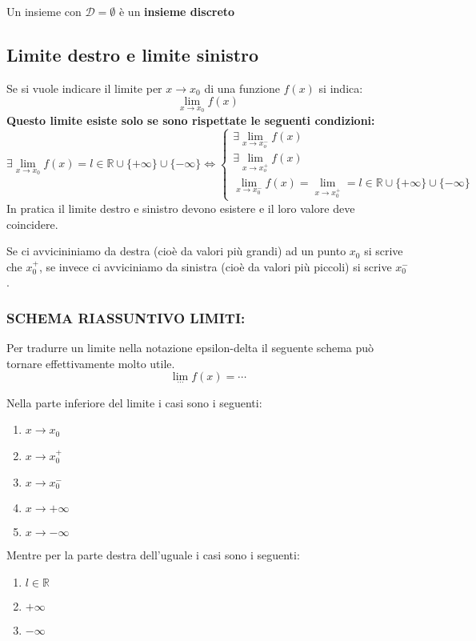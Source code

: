 Un insieme con $\mathcal{D} = \emptyset $ è un \textbf{insieme discreto}

\subsection{Limite destro e limite sinistro}
Se si vuole indicare il limite per $x \to x_0$ di una funzione $f(x)$ si indica:
\begin{equation*}
	\lim_{x \to x_0} f(x)
\end{equation*}
\textbf{Questo limite esiste solo se sono rispettate le seguenti condizioni:}
\begin{equation*}
	\exists \lim_{x \to x_0} f(x) = l \in \mathbb{R} \cup \{+\infty\} \cup \{-\infty\}\iff 
	\begin{cases*}
		\exists \lim_{x \to x_o^-} f(x)\\
		\exists \lim_{x \to x_o^+} f(x)\\
		\lim_{x \to x_0^-} f(x) = \lim_{x \to x_0^+} = l \in \mathbb{R} \cup \{+\infty\} \cup \{-\infty\}
	\end{cases*}
\end{equation*}
In pratica il limite destro e sinistro devono esistere e il loro valore deve coincidere.

Se ci avvicininiamo da destra (cioè da valori più grandi) ad un punto $x_0$ si scrive che $x_0^+$, se invece ci avviciniamo da sinistra (cioè da valori più piccoli) si scrive $x_0^-$.

\subsubsection{SCHEMA RIASSUNTIVO LIMITI:} 
Per tradurre un limite nella notazione epsilon-delta il seguente schema può tornare effettivamente molto utile.
\begin{equation*}
	\lim_{\cdots} f(x) = \cdots
\end{equation*}

Nella parte inferiore del limite i casi sono i seguenti:
\begin{enumerate}[label=(\roman*)]
    \item $x\to x_0$
    \item $x\to x_0^+$
    \item $x\to x_0^-$
    \item $x\to +\infty$
    \item $x\to -\infty$
\end{enumerate}

Mentre per la parte destra dell'uguale i casi sono i seguenti:
\begin{enumerate}
    \item $l \in \mathbb{R}$
    \item $+ \infty$
    \item $- \infty$
\end{enumerate}

